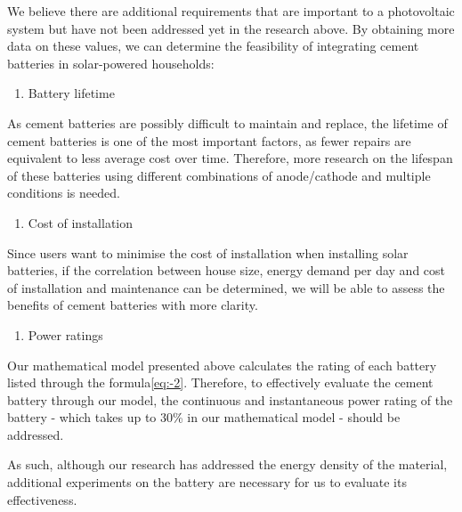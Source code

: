 We believe there are additional requirements that are important to a photovoltaic system but have not been addressed yet in the research above. By obtaining more data on these values, we can determine the feasibility of integrating cement batteries in solar-powered households:
\begin{enumerate}
    \item Battery lifetime
\end{enumerate}
As cement batteries are possibly difficult to maintain and replace, the lifetime of cement batteries is one of the most important factors, as fewer repairs are equivalent to less average cost over time. Therefore, more research on the lifespan of these batteries using different combinations of anode/cathode and multiple conditions is needed.
\begin{enumerate}[resume*]
    \item Cost of installation
\end{enumerate}
Since users want to minimise the cost of installation when installing solar batteries, if the correlation between house size, energy demand per day and cost of installation and maintenance can be determined, we will be able to assess the benefits of cement batteries with more clarity.

\begin{enumerate}[resume*]
    \item Power ratings 
\end{enumerate}
Our mathematical model presented above calculates the rating of each battery listed through the formula\eqref{eq:-2}. Therefore, to effectively evaluate the cement battery through our model, the continuous and instantaneous power rating of the battery - which takes up to 30\% in our mathematical model -  should be addressed.

As such, although our research has addressed the energy density of the material, additional experiments on the battery are necessary for us to evaluate its effectiveness.